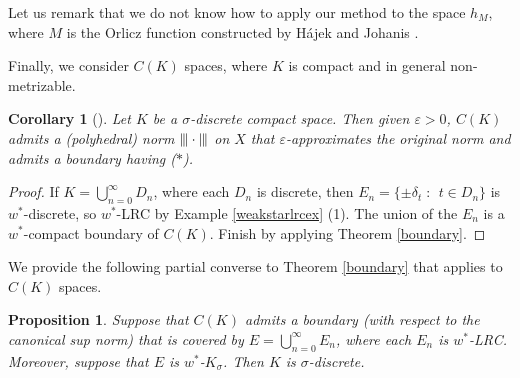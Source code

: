 \documentclass[12pt,a4paper]{amsart}
\newtheorem{proposition}[theorem]{Proposition}
\newtheorem{corollary}[theorem]{Corollary}
\theoremstyle{definition}
\theoremstyle{remark}
\newcommand{\eps}{\ensuremath{\varepsilon}}
\newcommand{\Ksig}{\ensuremath{K_\sigma}}
\newcommand{\ndot}{\ensuremath{\left\|\cdot\right\|}}
\newcommand{\set}[2]{\{{#1} \;:\;\, {#2}\}}
\newcommand{\st}{($*$)}
\newcommand{\tri}{{\displaystyle |\kern-.9pt|\kern-.9pt|}}
\newcommand{\tndot}{\ensuremath{\tri\cdot\tri}}
\begin{document}
Let us remark that we do not know how to apply our method
to the space $h_M$, where $M$ is the Orlicz function constructed
by H\'ajek and Johanis \cite{HJ}.

Finally, we consider $C(K)$ spaces, where $K$ is compact and
in general non-metrizable.

\begin{corollary}[{\cite[Theorem 11]{FPST}}]
Let $K$ be a $\sigma$-discrete compact space. Then given $\eps>0$,
$C(K)$ admits a (polyhedral) norm $\tndot$ on $X$ that $\eps$-approximates the
original norm and admits a boundary having {\st}.
\end{corollary}

\begin{proof}
If $K = \bigcup_{n=0}^\infty D_n$, where each $D_n$ is discrete, then
$E_n = \set{\pm \delta_t}{t \in D_n}$ is $w^*$-discrete, so
$w^*$-LRC by Example \ref{weakstarlrcex} (1). The union of the $E_n$
is a $w^*$-compact boundary of $C(K)$. Finish by applying Theorem \ref{boundary}.
\end{proof}

We provide the following partial converse to Theorem \ref{boundary} that
applies to $C(K)$ spaces.

\begin{proposition}\label{sigma-discrete-converse}
Suppose that $C(K)$ admits a boundary (with respect to the canonical sup norm) %
that is covered by $E=\bigcup_{n=0}^\infty E_n$, where each $E_n$ is
$w^*$-LRC. Moreover, suppose that $E$ is $w^*$-$\Ksig$. Then
$K$ is $\sigma$-discrete.
\end{proposition}
\end{document}
